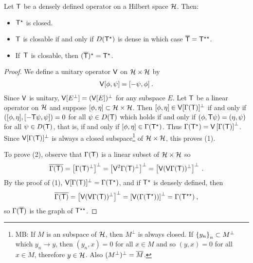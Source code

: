 \begin{theorem}
Let $\mathsf{T}$ be a densely defined operator on a Hilbert space $\mathcal{H}$. Then:
\begin{itemize}
    \item $\mathsf{T}^\star$ is closed.
    \item $\mathsf{T}$ is closable if and only if $D(\mathsf{T}^\star)$ is dense in which case $\overline{\mathsf{T}} = \mathsf{T}^{\star \star}$.
    \item If \,$\mathsf{T}$ is closable, then $(\overline{\mathsf{T}})^\star = \mathsf{T}^\star$.
\end{itemize}

\end{theorem}

\begin{proof}
We define a unitary operator $\mathsf{V}$ on $\mathcal{H} \times \mathcal{H}$ by
\begin{align}
    \mathsf{V} [\phi, \psi] = [-\psi, \phi] \:.
\end{align}
Since $\mathsf{V}$ is unitary, $\mathsf{V}[E^\bot] = (\mathsf{V}[E])^\bot$ for any subspace $E$. Let $\mathsf{T}$ be a linear operator on $\mathcal{H}$ and suppose $[\phi, \eta] \subset \mathcal{H} \times \mathcal{H}$. Then $[\phi, \eta] \in \mathsf{V}[\Gamma(\mathsf{T})]^\bot$ if and only if $\left( [\phi, \eta], [- \mathsf{T} \psi, \psi] \right) = 0$ for all $\psi \in D(\mathsf{T})$ which holds if and only if $(\phi, \mathsf{T} \psi) = (\eta, \psi)$ for all $\psi \in D(\mathsf{T})$, that is, if and only if $[\phi, \eta] \in \Gamma(\mathsf{T}^\star)$. Thus $\Gamma(\mathsf{T}^\star) = \mathsf{V} \left[\Gamma(\mathsf{T}) \right]^\bot$. 
Since $\mathsf{V}[\Gamma(\mathsf{T})]^\bot$ is always a closed subspace\footnote[1]{MB: If $M$ is an subspace of $\mathcal{H}$, then $M^\bot$ is always closed. If $\left \lbrace y_n \right \rbrace_n \subset M^\bot$ which $y_n \rightarrow y$, then $(y_n,x) = 0$ for all $x \in M$ and so $(y,x) = 0$ for all $x \in M$, therefore $y \in \mathcal{H}$. Also $(M^\bot)^\bot = \overline{M}$.} of $\mathcal{H} \times \mathcal{H}$, this proves (1).

To prove (2), observe that $\Gamma(\mathsf{T})$ is a linear subset of $\mathcal{H} \times \mathcal{H}$ so
\begin{align}
    \overline{\Gamma(\mathsf{T})} = \left[ \Gamma(\mathsf{T})^\bot \right]^\bot = \left[ \mathsf{V}^2 \Gamma(\mathsf{T})^\bot \right]^\bot = \left[ \mathsf{V}(\mathsf{V} \Gamma(\mathsf{T}))^\bot \right]^\bot \:.
\end{align}
By the proof of (1), $\mathsf{V} [\Gamma (\mathsf{T})]^\bot = \Gamma (\mathsf{T}^\star)$, and if $\mathsf{T}^\star$ is densely defined, then 
\begin{align}
    \overline{\Gamma(\mathsf{T})} = \left[ \mathsf{V}(\mathsf{V} \Gamma(\mathsf{T}))^\bot \right]^\bot = \left[ \mathsf{V}(\Gamma(\mathsf{T}^\star))\right]^\bot = \Gamma(\mathsf{T}^{\star \star}) \:, 
\end{align}
so $\Gamma(\overline{\mathsf{T}})$ is the graph of $\mathsf{T}^{\star \star}$.


\end{proof}
